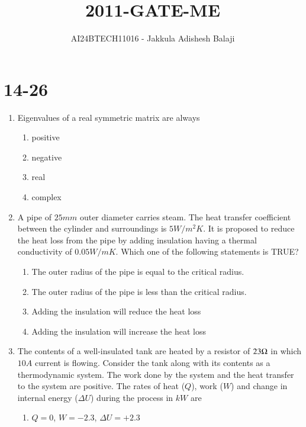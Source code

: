 \documentclass[journal]{IEEEtran}
\begin{document}

\title{2011-GATE-ME}
\author{AI24BTECH11016 - Jakkula Adishesh Balaji}
{\let\newpage\relax\maketitle}

\renewcommand{\thefigure}{\theenumi}
\renewcommand{\thetable}{\theenumi}
\setlength{\intextsep}{10pt} %
\section{14-26}
\begin{enumerate}
	\item
	Eigenvalues of a real symmetric matrix are always
		\begin{enumerate}
			\item positive
			\item negative
			\item real
			\item complex
		\end{enumerate}
	\item
	A pipe of $25 mm$ outer diameter carries steam. The heat transfer coefficient between the cylinder and surroundings is $5 W/m^{2}K$. It is proposed to reduce the heat loss from the pipe by adding insulation having a thermal conductivity of $0.05 W/mK$. Which one of the following statements is TRUE?
		\begin{enumerate}
			\item The outer radius of the pipe is equal to the critical radius.
			\item The outer radius of the pipe is less than the critical radius.
			\item Adding the insulation will reduce the heat loss
			\item Adding the insulation will increase the heat loss
		\end{enumerate}
	\item
	The contents of a well-insulated tank are heated by a resistor of $23 \ohm$ in which $10 A$ current is flowing. Consider the tank along with its contents as a thermodynamic system. The work done by the system and the heat transfer to the system are positive. The rates of heat ($Q$), work ($W$) and change in internal energy ($\Delta U$) during the process in $kW$ are
		\begin{enumerate}	
			\item $Q=0$, $W=-2.3$, $\Delta U = +2.3$

\end{enumerate}
\end{enumerate}
\end{document}
